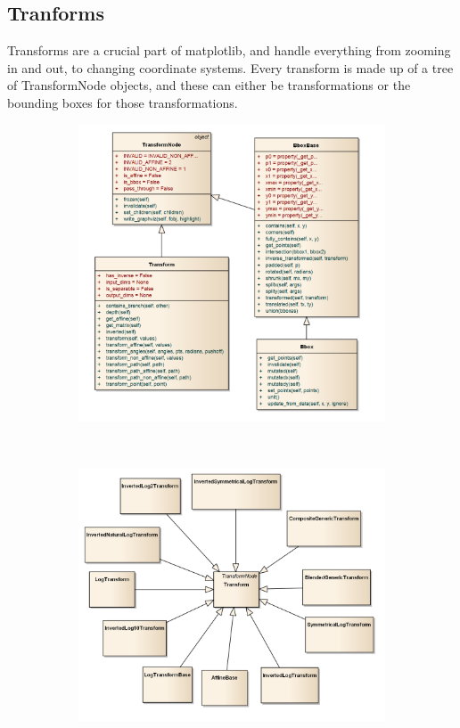 \documentclass[pdftex,10pt,a4paper]{report}
\begin{document}
\subsection{Tranforms}
Transforms are a crucial part of matplotlib, and handle everything from zooming in and out, to changing coordinate systems. Every transform is made up of a tree of TransformNode objects, and these can either be transformations or the bounding boxes for those transformations.
\begin{figure}[ht!]
        \centering
        \begin{subfigure}[b]{0.4\textwidth}
                \includegraphics[width=\textwidth]{img/umls/andrew/transformNode}
                \caption{}
                \label{fig:transform1}
        \end{subfigure}%
        ~ %
        \begin{subfigure}[b]{0.4\textwidth}
                \includegraphics[width=\textwidth]{img/umls/andrew/transform}

\end{subfigure}
\end{figure}
\end{document}

